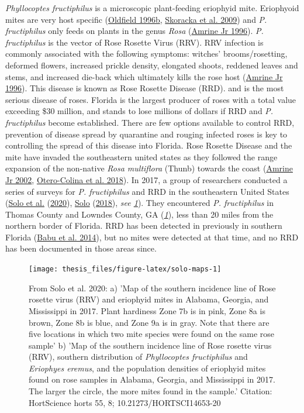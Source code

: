 \documentclass[12pt,final,CPage]{ufthesis}
\begin{document}
{  \emph{Phyllocoptes fructiphilus} is a microscopic plant-feeding eriophyid mite. Eriophyoid mites are very host specific (\protect\hyperlink{ref-Oldfield1996c}{Oldfield 1996b}, \protect\hyperlink{ref-Skoracka2009}{Skoracka et al. 2009}) and \emph{P. fructiphilus} only feeds on plants in the genus \emph{Rosa} (\protect\hyperlink{ref-Amrine1996}{Amrine Jr 1996}). \emph{P. fructiphilus} is the vector of Rose Rosette Virus (RRV). RRV infection is commonly associated with the following symptoms: witches' brooms/rosetting, deformed flowers, increased prickle density, elongated shoots, reddened leaves and stems, and increased die-back which ultimately kills the rose host (\protect\hyperlink{ref-Amrine1996}{Amrine Jr 1996}). This disease is known as Rose Rosette Disease (RRD). and is the most serious disease of roses. Florida is the largest producer of roses with a total value exceeding \$30 million, and stands to lose millions of dollars if RRD and \emph{P. fructiphilus} become established. There are few options available to control RRD, prevention of disease spread by quarantine and rouging infected roses is key to controlling the spread of this disease into Florida. Rose Rosette Disease and the mite have invaded the southeastern united states as they followed the range expansion of the non-native \emph{Rosa multiflora} (Thunb) towards the coast (\protect\hyperlink{ref-Amrine2002}{Amrine Jr 2002}, \protect\hyperlink{ref-Otero-Colina2018}{Otero-Colina et al. 2018}). In 2017, a group of researchers conducted a series of surveys for \emph{P. fructiphilus} and RRD in the southeastern United States (\protect\hyperlink{ref-Solo2020}{Solo et al.} (\protect\hyperlink{ref-Solo2020}{2020}), \protect\hyperlink{ref-Solo2018}{Solo} (\protect\hyperlink{ref-Solo2018}{2018}), \emph{see \ref{fig:solo-maps}}). They encountered \emph{P. fructiphilus} in Thomas County and Lowndes County, GA (\emph{\ref{fig:solo-maps}}), less than 20 miles from the northern border of Florida. RRD has been detected in previously in southern Florida (\protect\hyperlink{ref-Babu2014}{Babu et al. 2014}), but no mites were detected at that time, and no RRD has been documented in those areas since.
  \begin{figure}

  {\centering \texttt{[image: thesis\_files/figure-latex/solo-maps-1]} 

  }

  \caption{From Solo et al. 2020: a) 'Map of the southern incidence line of Rose rosette virus (RRV) and eriophyid mites in Alabama, Georgia, and Mississippi in 2017. Plant hardiness Zone 7b is in pink, Zone 8a is brown, Zone 8b is blue, and Zone 9a is in gray. Note that there are five locations in which two mite species were found on the same rose sample' b) 'Map of the southern incidence line of Rose rosette virus (RRV), southern distribution of \textit{Phyllocoptes fructiphilus} and \textit{Eriophyes eremus}, and the population densities of eriophyid mites found on rose samples in Alabama, Georgia, and Mississippi in 2017. The larger the circle, the more mites found in the sample.' Citation: HortScience horts 55, 8; 10.21273/HORTSCI14653-20}\label{fig:solo-maps}
  \end{figure}
  \hypertarget{intro-survey}{%
}}
\end{document}
